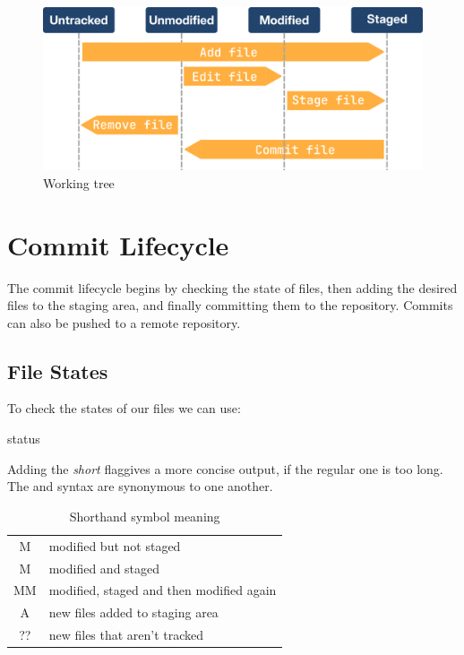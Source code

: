 \begin{figure}[H]
\centering
    \centering
    \includegraphics[scale=1]{Images/workingTree.png}
    \caption{Working tree}
\end{figure}

\section{Commit Lifecycle}
The commit lifecycle begins by checking the state of files, then adding the desired files to the staging area, and finally committing them to the repository. Commits can also be pushed to a remote repository.

\subsection{File States}
To check the states of our files we can use:
\begin{gitBashBox}
status
\end{gitBashBox}
\noindent Adding the \textit{short} flag\footnotemark gives a more concise output, if the regular one is too long. The  and  syntax are synonymous to one another.
\begin{table}[H]
    \centering
    \begin{tabular}{c|l}
       \hspace{2mm} M  & modified but not staged\\[2pt]
       M\hspace{3mm}   & modified and staged\\[2pt]
       MM  & modified, staged and then modified again \\[2pt]
       A\hspace{3mm}   & new files added to staging area \\[2pt]
       ?\hspace{0.7mm}?  & new files that aren't tracked \\
       
    \end{tabular}
    \caption{Shorthand symbol meaning}
    \label{tab:short_symbols}
\end{table}


